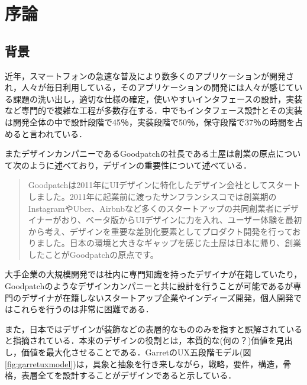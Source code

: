 \chapter{序論}
\label{chap:introduction}

\section{背景}
近年，スマートフォンの急速な普及により数多くのアプリケーションが開発され，人々が毎日利用している，そのアプリケーションの開発には人々が感じている課題の洗い出し，適切な仕様の確定，使いやすいインタフェースの設計，実装など専門的で複雑な工程が多数存在する．中でもインタフェース設計とその実装は開発全体の中で設計段階で45％，実装段階で50％，保守段階で37％の時間を占めると言われている\cite{myers1992survey}．

またデザインカンパニーであるGoodpatchの社長である土屋は創業の原点について次のように述べており，デザインの重要性について述べている．

\begin{quotation}
Goodpatchは2011年にUIデザインに特化したデザイン会社としてスタートしました。2011年に起業前に渡ったサンフランシスコでは創業期のInstagramやUber、Airbnbなど多くのスタートアップの共同創業者にデザイナーがおり、ベータ版からUIデザインに力を入れ、ユーザー体験を最初から考え、デザインを重要な差別化要素としてプロダクト開発を行っておりました。日本の環境と大きなギャップを感じた土屋は日本に帰り、創業したことがGoodpatchの原点です。\cite{goodpatchwhydesign}
\end{quotation}

大手企業の大規模開発では社内に専門知識を持ったデザイナが在籍していたり，Goodpatchのようなデザインカンパニーと共に設計を行うことが可能であるが専門のデザイナが在籍しないスタートアップ企業やインディーズ開発，個人開発ではこれらを行うのは非常に困難である．

また，日本ではデザインが装飾などの表層的なもののみを指すと誤解されていると指摘されている\cite{goodpatchwhydesign}．本来のデザインの役割とは，本質的な(何の？)価値を見出し，価値を最大化させることである．GarretのUX五段階モデル(図\ref{fig:garretuxmodel})は，具象と抽象を行き来しながら，戦略，要件，構造，骨格，表層全てを設計することがデザインであると示している．

